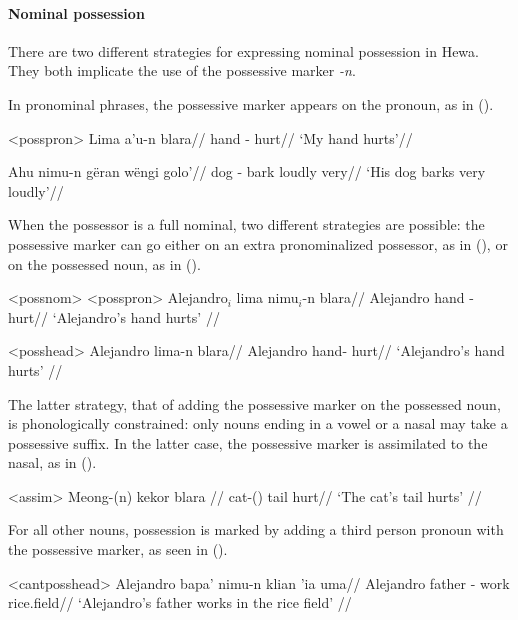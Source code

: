\documentclass[../hewa_main-subfiles.tex]{subfiles}
\begin{document}
\paragraph{Nominal possession}

There are two different strategies for expressing nominal possession in Hewa. They both implicate the use of the possessive marker \textit{-n}.

In pronominal phrases, the possessive marker appears on the pronoun, as in ().

\pex<posspron> %
\begingl %
\gla Lima a'u-n blara//
\glb hand \First{}\Sg{}-\Poss{} hurt//
\glft `My hand hurts'//
\endgl

\begingl %
\gla Ahu nimu-n gëran wëngi golo'//
\glb dog \Third{}\Sg{}-\Poss{} bark loudly very//
\glft `His dog barks very loudly'// 
\endgl
\xe

When the possessor is a full nominal, two different strategies are possible: the possessive marker can go either on an extra pronominalized possessor, as in (), or on the possessed noun, as in ().

\pex<possnom> %
\a<posspron> %
\begingl %
\gla Alejandro$_i$ lima nimu$_i$-n blara//
\glb Alejandro hand \Third{}\Sg{}-\Poss{} hurt//
\glft `Alejandro's hand hurts' // 
\endgl

\a<posshead> %
\begingl %
\gla Alejandro lima-n blara//
\glb Alejandro hand-\Poss{} hurt//
\glft `Alejandro's hand hurts' // 
\endgl
\xe

The latter strategy, that of adding the possessive marker on the possessed noun, is phonologically constrained: only  nouns ending in a vowel or a nasal may take a possessive suffix. In the latter case, the possessive marker is assimilated to the nasal, as in ().

\ex<assim> %
\begingl %
\gla Meong-(n) kekor blara //
\glb cat-(\Poss{}) tail hurt//
\glft `The cat's tail hurts' // 
\endgl %
\xe

For all other nouns, possession is marked by adding a third person pronoun with the possessive marker, as seen in ().

\ex<cantposshead>
\begingl %
\gla Alejandro bapa' nimu-n klian 'ia uma//
\glb Alejandro father \Third{}\Sg{}-\Poss{} work \Loc{} rice.field//
\glft `Alejandro's father works in the rice field' // 
\endgl
\xe
\end{document}
